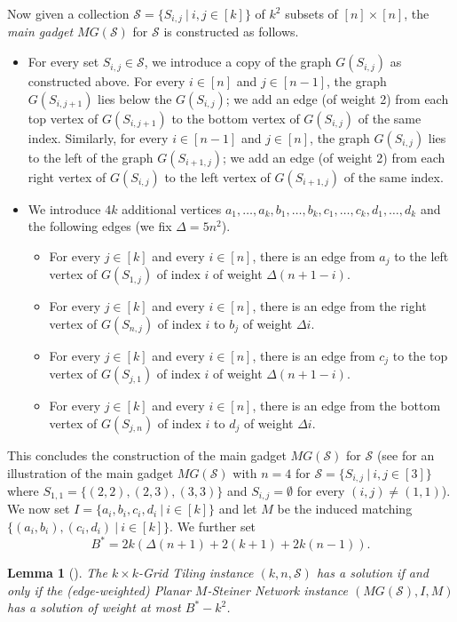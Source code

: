 \documentclass[a4paper,11pt]{article}
\theoremstyle{plain}
\newtheorem{lemma}[theorem]{Lemma}
\newtheorem{identification rule}{Identification Rule}
\theoremstyle{definition}
\theoremstyle{remark}
\begin{document}
Now given a collection $\mathcal{S} = \{S_{i,j}~|~i,j \in [k]\}$ of $k^2$ subsets of $[n] \times [n]$, the \emph{main gadget $MG(\mathcal{S})$} for $\mathcal{S}$ is constructed as follows.
\begin{itemize}
\item For every set $S_{i,j} \in \mathcal{S}$, we introduce a copy of the graph $G(S_{i,j})$ as constructed above. For every $i \in [n]$ and $j \in [n-1]$, the graph $G(S_{i,j+1})$ lies below the $G(S_{i,j})$; we add an edge (of weight 2) from each top vertex of $G(S_{i,j+1})$ to the bottom vertex of $G(S_{i,j})$ of the same index. Similarly, for every $i \in [n-1]$ and $j \in [n]$, the graph $G(S_{i,j})$ lies to the left of the graph $G(S_{i+1,j})$; we add an edge (of weight 2) from each right vertex of $G(S_{i,j})$ to the left vertex of $G(S_{i+1,j})$ of the same index.
\item We introduce $4k$ additional vertices $a_1,\ldots,a_k,b_1,\ldots,b_k,c_1,\ldots,c_k,d_1,\ldots,d_k$ and the following edges (we fix $\Delta = 5n^2$).
\begin{itemize}
\item For every $j \in [k]$ and every $i \in [n]$, there is an edge from $a_j$ to the left vertex of $G(S_{1,j})$ of index $i$ of weight $\Delta(n+1-i)$.
\item For every $j \in [k]$ and every $i \in [n]$, there is an edge from the right vertex of $G(S_{n,j})$ of index $i$ to $b_j$ of weight $\Delta i$.
\item For every $j \in [k]$ and every $i \in [n]$, there is an edge from $c_j$ to the top vertex of $G(S_{j,1})$ of index $i$ of weight $\Delta(n+1-i)$.
\item For every $j \in [k]$ and every $i \in [n]$, there is an edge from the bottom vertex of $G(S_{j,n})$ of index $i$ to $d_j$ of weight $\Delta i$.
\end{itemize}
\end{itemize}
This concludes the construction of the main gadget $MG(\mathcal{S})$ for $\mathcal{S}$ (see  for an illustration of the main gadget $MG(\mathcal{S})$ with $n=4$ for $\mathcal{S} = \{S_{i,j}~|~i,j \in [3]\}$ where $S_{1,1} =\{(2,2),(2,3),(3,3)\}$ and $S_{i,j} = \emptyset$ for every $(i,j) \neq (1,1)$). We now set $I = \{a_i,b_i,c_i,d_i~|~i \in [k]\}$ and let $M$ be the induced matching $\{(a_i,b_i),(c_i,d_i)~|~i\in [k]\}$. We further set
\[
B^* = 2k(\Delta(n+1) + 2(k+1) +2k(n-1)).
\]

\begin{lemma}[\cite{ChitnisFHM20}]
\label{lem:grid-dsn}
The {\sc $k \times k$-Grid Tiling} instance $(k,n,\mathcal{S})$ has a solution if and only if the (edge-weighted) {\sc Planar $M$-Steiner Network} instance $(MG(\mathcal{S}),I,M)$ has a solution of weight at most $B^*-k^2$.
\end{lemma}
\end{document}
